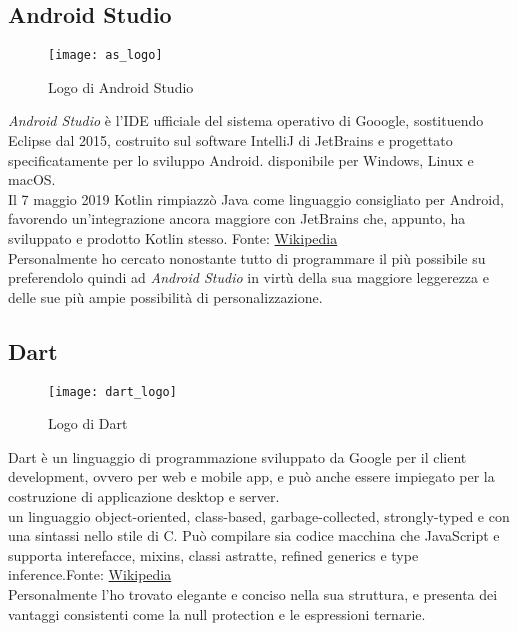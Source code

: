 \subsection{Android Studio}
\begin{figure}[ht]
    \centering
    \texttt{[image: as\_logo]}
    \caption{Logo di Android Studio}
\end{figure}\aCapo{}
\textit{Android Studio} è l'IDE ufficiale del sistema operativo di Gooogle, sostituendo Eclipse dal 2015, costruito sul software IntelliJ di JetBrains e progettato specificatamente per lo sviluppo Android. \E{} disponibile per Windows, Linux e macOS.\\
Il 7 maggio 2019 Kotlin rimpiazzò Java come linguaggio consigliato per Android, favorendo un'integrazione ancora maggiore con JetBrains che, appunto, ha sviluppato e prodotto Kotlin stesso. {\tiny Fonte: \href{https://en.wikipedia.org/wiki/Android_Studio}{Wikipedia}}\\
Personalmente ho cercato nonostante tutto di programmare il più possibile su \vsc{} preferendolo quindi ad \textit{Android Studio} in virtù della sua maggiore leggerezza e delle sue più ampie possibilità di personalizzazione.

\subsection{Dart}
\begin{figure}[ht]
    \centering
    \texttt{[image: dart\_logo]}
    \caption{Logo di Dart}
\end{figure} \aCapo{}
Dart è un linguaggio di programmazione sviluppato da Google per il client development, ovvero per web e mobile app, e può anche essere impiegato per la costruzione di applicazione desktop e server.\\
\E{} un linguaggio object-oriented, class-based, garbage-collected, strongly-typed e con una sintassi nello stile di C. Può compilare sia codice macchina che JavaScript e supporta interefacce, mixins, classi astratte, refined generics e type inference.{\tiny Fonte: \href{https://en.wikipedia.org/wiki/Dart_(programming_language)}{Wikipedia}}\\
Personalmente l'ho trovato elegante e conciso nella sua struttura, e presenta dei vantaggi consistenti come la null protection e le espressioni ternarie.

